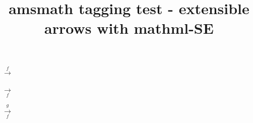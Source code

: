 \documentclass{article}
\title{amsmath tagging test - extensible arrows with mathml-SE}
\begin{document}
$\xrightarrow{f}$ %

$\xrightarrow[f]{}$

$\xrightarrow[f]{g}$
\end{document}
